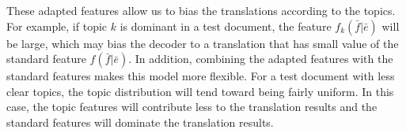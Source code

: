 These adapted features allow us to bias the translations according to
the topics. For example, if topic $k$ is dominant in a test document,
the feature $f_k(\bar{f} | \bar{e})$ will be large, which may bias the
decoder to a translation that has small value of the standard feature
$f(\bar{f}|\bar{e})$. In addition, combining the adapted features with
the standard features makes this model more flexible. For a test
document with less clear topics, the topic distribution will tend
toward being fairly uniform. In this case, the topic features will
contribute less to the translation results and the standard features
will dominate the translation results.


%


